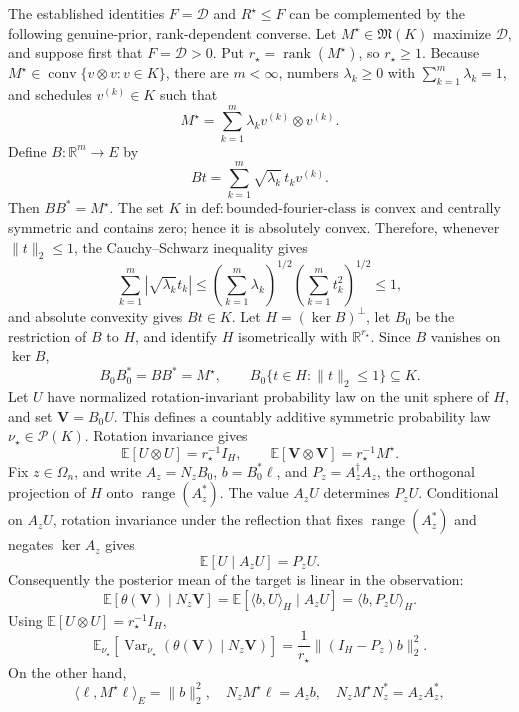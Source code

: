 The established identities \(F=\mathcal D\) and \(R^{\star}\le F\) can be complemented by the following genuine-prior, rank-dependent converse.  Let \(M^{\star}\in\mathfrak M(K)\) maximize \(\mathcal D\), and suppose first that \(F=\mathcal D>0\).  Put \(r_{\star}=\operatorname{rank}(M^{\star})\), so \(r_{\star}\ge1\).  Because \(M^{\star}\in\operatorname{conv}\{v\otimes v:v\in K\}\), there are \(m<\infty\), numbers \(\lambda_k\ge0\) with \(\sum_{k=1}^m\lambda_k=1\), and schedules \(v^{(k)}\in K\) such that
\[
 M^{\star}=\sum_{k=1}^m\lambda_k v^{(k)}\otimes v^{(k)}.
\]
Define \(B:\mathbb R^m\to E\) by
\[
 Bt=\sum_{k=1}^m\sqrt{\lambda_k}\,t_kv^{(k)}.
\]
Then \(BB^{\ast}=M^{\star}\).  The set \(K\) in \(\mathrm{def:bounded\mbox{-}fourier\mbox{-}class}\) is convex and centrally symmetric and contains zero; hence it is absolutely convex.  Therefore, whenever \(\lVert t\rVert_2\le1\), the Cauchy--Schwarz inequality gives
\[
 \sum_{k=1}^m\left|\sqrt{\lambda_k}t_k\right|
 \le
 \left(\sum_{k=1}^m\lambda_k\right)^{1/2}
 \left(\sum_{k=1}^m t_k^2\right)^{1/2}
 \le1,
\]
and absolute convexity gives \(Bt\in K\).  Let \(H=(\ker B)^{\perp}\), let \(B_0\) be the restriction of \(B\) to \(H\), and identify \(H\) isometrically with \(\mathbb R^{r_{\star}}\).  Since \(B\) vanishes on \(\ker B\),
\[
 B_0B_0^{\ast}=BB^{\ast}=M^{\star},
 \qquad
 B_0\{t\in H:\lVert t\rVert_2\le1\}\subseteq K.
\]
Let \(U\) have normalized rotation-invariant probability law on the unit sphere of \(H\), and set \(\mathbf V=B_0U\).  This defines a countably additive symmetric probability law \(\nu_{\star}\in\mathcal P(K)\).  Rotation invariance gives
\[
 \mathbb E[U\otimes U]=r_{\star}^{-1}I_H,
 \qquad
 \mathbb E[\mathbf V\otimes\mathbf V]=r_{\star}^{-1}M^{\star}.
\]
Fix \(z\in\Omega_n\), and write \(A_z=N_zB_0\), \(b=B_0^{\ast}\ell\), and \(P_z=A_z^{\dagger}A_z\), the orthogonal projection of \(H\) onto \(\operatorname{range}(A_z^{\ast})\).  The value \(A_zU\) determines \(P_zU\).  Conditional on \(A_zU\), rotation invariance under the reflection that fixes \(\operatorname{range}(A_z^{\ast})\) and negates \(\ker A_z\) gives
\[
 \mathbb E[U\mid A_zU]=P_zU.
\]
Consequently the posterior mean of the target is linear in the observation:
\[
 \mathbb E[\theta(\mathbf V)\mid N_z\mathbf V]
 =\mathbb E[\langle b,U\rangle_H\mid A_zU]
 =\langle b,P_zU\rangle_H.
\]
Using \(\mathbb E[U\otimes U]=r_{\star}^{-1}I_H\),
\[
 \mathbb E_{\nu_{\star}}\!\left[
   \operatorname{Var}_{\nu_{\star}}(\theta(\mathbf V)\mid N_z\mathbf V)
 \right]
 =\frac{1}{r_{\star}}\lVert(I_H-P_z)b\rVert_2^2.
\]
On the other hand,
\[
 \langle\ell,M^{\star}\ell\rangle_E=\lVert b\rVert_2^2,
 \quad
 N_zM^{\star}\ell=A_zb,
 \quad
 N_zM^{\star}N_z^{\ast}=A_zA_z^{\ast},
\]
